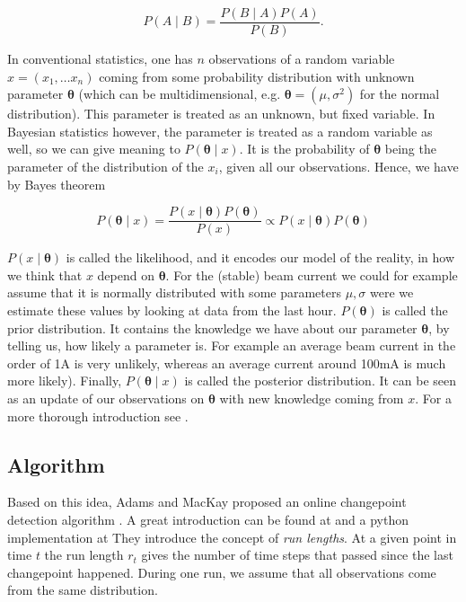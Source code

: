 \documentclass[12pt,a4paper]{article}
\begin{document}
\begin{equation*}
P\left(A \mid B\right)=\frac{P\left(B \mid A\right)P\left(A\right)}{P\left(B\right)}.
\end{equation*}

In conventional statistics, one has $n$ observations of a random variable $ x = \left(x_1, \dots x_n\right)$ coming from some probability distribution with unknown parameter $\bm{{\theta}}$ (which can be multidimensional, e.g. $\bm{{\theta}}=\left(\mu, \sigma^2 \right)$ for the normal distribution). This parameter is treated as an unknown, but fixed variable. In Bayesian statistics however, the parameter is treated as a random variable as well, so we can give meaning to $P\left(\bm{{\theta}} \mid x\right)$. It is the probability of $\bm{{\theta}}$ being the parameter of the distribution of the $x_i$, given all our observations. Hence, we have by Bayes theorem

\begin{equation} \label{eq:posterior_distribution}
	P\left(\bm {{\theta}} \mid x\right)=\frac{P\left(x \mid \bm{{\theta}}\right)P\left(\bm {{\theta}}\right)}{P\left(x\right)} \propto P\left(x \mid \bm{{\theta}}\right)P\left(\bm {{\theta}}\right)
\end{equation}

$P\left(x \mid \bm{{\theta}}\right)$ is called the likelihood, and it encodes our model of the reality, in how we think that $x$ depend on $\bm{{\theta}}$. For the (stable) beam current we could for example assume that it is normally distributed with some parameters $\mu, \sigma$ were we estimate these values by looking at data from the last hour. $P\left(\bm {{\theta}}\right)$ is called the prior distribution. It contains the knowledge we have about our parameter $\bm{{\theta}}$, by telling us, how likely a parameter is. For example an average beam current in the order of 1A is very unlikely, whereas an average current around 100mA is much more likely).  Finally, $P\left(\bm {{\theta}} \mid x\right)$ is called the posterior distribution. It can be seen as an update of our observations on $\bm{{\theta}}$ with new knowledge coming from $x$. For a more thorough introduction see \cite{Spiegelhalter:Bayesianstatistics,Brooks-Bartlett:Probabilityconceptsexplained}.

\subsection{Algorithm}

Based on this idea, Adams and MacKay proposed an online changepoint detection algorithm \cite{Adams:BayesianOnlineChangepoint}. A great introduction can be found at \cite{Gundersen:BayesianOnlineChangepoint} and a python implementation at \cite{Kulick:bayesianchangepointdetection} They introduce the concept of \textit{run lengths}. At a given point in time $t$ the run length $r_t$ gives the number of time steps that passed since the last changepoint happened. During one run, we assume that all observations come from the same distribution.
\end{document}

